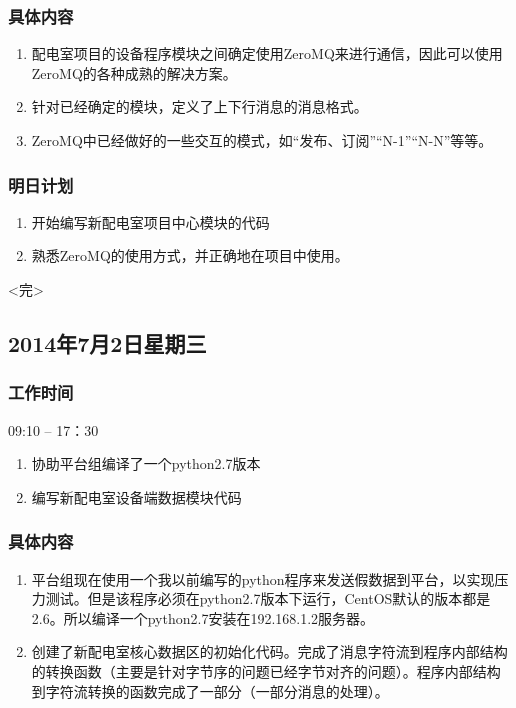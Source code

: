 \documentclass[11pt]{article}
\begin{document}
\subsubsection{具体内容}
  \begin{enumerate}
  \item 配电室项目的设备程序模块之间确定使用ZeroMQ来进行通信，因此可以使用ZeroMQ的各种成熟的解决方案。
  \item 针对已经确定的模块，定义了上下行消息的消息格式。
  \item ZeroMQ中已经做好的一些交互的模式，如“发布、订阅”“N-1”“N-N”等等。
  \end{enumerate}
  
\subsubsection{明日计划}
  \begin{enumerate}
  \item 开始编写新配电室项目中心模块的代码
  \item 熟悉ZeroMQ的使用方式，并正确地在项目中使用。
  \end{enumerate}

\begin{center}
  <完>
\end{center}
  
\newpage

\subsection{2014年7月2日星期三}
\subsubsection{工作时间}
  
  09:10 – 17：30

  \begin{enumerate}
  \item 协助平台组编译了一个python2.7版本
  \item 编写新配电室设备端数据模块代码
  \end{enumerate}
\subsubsection{具体内容}
  \begin{enumerate}
  \item 平台组现在使用一个我以前编写的python程序来发送假数据到平台，以实现压力测试。但是该程序必须在python2.7版本下运行，CentOS默认的版本都是2.6。所以编译一个python2.7安装在192.168.1.2服务器。
  \item 创建了新配电室核心数据区的初始化代码。完成了消息字符流到程序内部结构的转换函数（主要是针对字节序的问题已经字节对齐的问题）。程序内部结构到字符流转换的函数完成了一部分（一部分消息的处理）。
  \end{enumerate}
\end{document}
